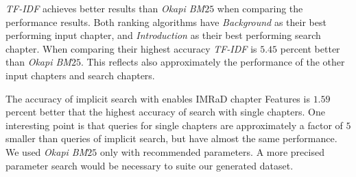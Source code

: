 \textit{TF-IDF} achieves better results than \textit{Okapi BM$25$} when comparing the performance results. Both ranking algorithms have \textit{Background} as their best performing input chapter, and \textit{Introduction} as their best performing search chapter. When comparing their highest accuracy \textit{TF-IDF} is $5.45$ percent better than \textit{Okapi BM$25$}. This reflects also approximately the performance of the other input chapters and search chapters.

The accuracy of implicit search with enables IMRaD chapter Features is $1.59$ percent better that the highest accuracy of search with single chapters. One interesting point is that queries for single chapters are approximately a factor of $5$ smaller than queries of implicit search, but have almost the same performance. We used \textit{Okapi BM$25$} only with recommended parameters. A more precised parameter search would be necessary to suite our generated dataset.